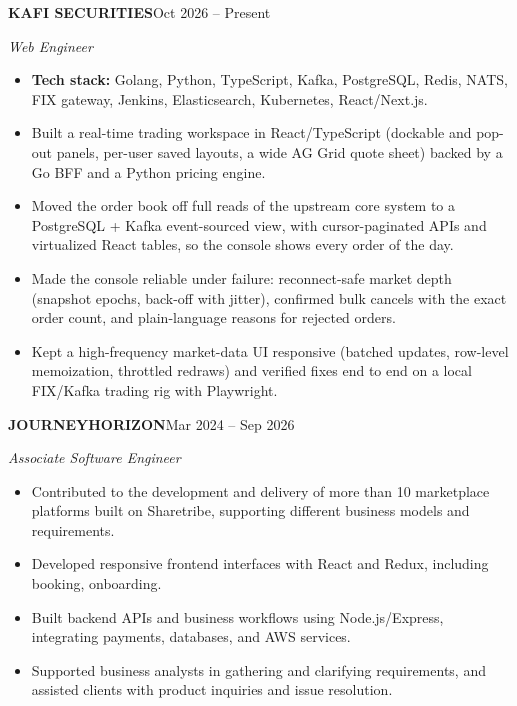 \documentclass[10pt,a4paper]{article}
\newcommand{\sect}[1]{\vspace{7pt}{\large\bfseries\MakeUppercase{#1}}\par\vspace{3pt}}
\newcommand{\entry}[2]{\textbf{#1}\hfill #2\par}
\begin{document}
\sect{Professional Experience}
\entry{KAFI SECURITIES}{Oct 2026 -- Present}
\textit{Web Engineer}
\begin{itemize}
  \item \textbf{Tech stack:} Golang, Python, TypeScript, Kafka, PostgreSQL, Redis, NATS, FIX gateway, Jenkins, Elasticsearch, Kubernetes, React/Next.js.
  \item Built a real-time trading workspace in React/TypeScript (dockable and pop-out panels, per-user saved layouts, a wide AG Grid quote sheet) backed by a Go BFF and a Python pricing engine.
  \item Moved the order book off full reads of the upstream core system to a PostgreSQL + Kafka event-sourced view, with cursor-paginated APIs and virtualized React tables, so the console shows every order of the day.
  \item Made the console reliable under failure: reconnect-safe market depth (snapshot epochs, back-off with jitter), confirmed bulk cancels with the exact order count, and plain-language reasons for rejected orders.
  \item Kept a high-frequency market-data UI responsive (batched updates, row-level memoization, throttled redraws) and verified fixes end to end on a local FIX/Kafka trading rig with Playwright.
\end{itemize}
\entry{JOURNEYHORIZON}{Mar 2024 -- Sep 2026}
\textit{Associate Software Engineer}
\begin{itemize}
  \item Contributed to the development and delivery of more than 10 marketplace platforms built on Sharetribe, supporting different business models and requirements.
  \item Developed responsive frontend interfaces with React and Redux, including booking, onboarding.
  \item Built backend APIs and business workflows using Node.js/Express, integrating payments, databases, and AWS services.
  \item Supported business analysts in gathering and clarifying requirements, and assisted clients with product inquiries and issue resolution.
\end{itemize}
\end{document}
